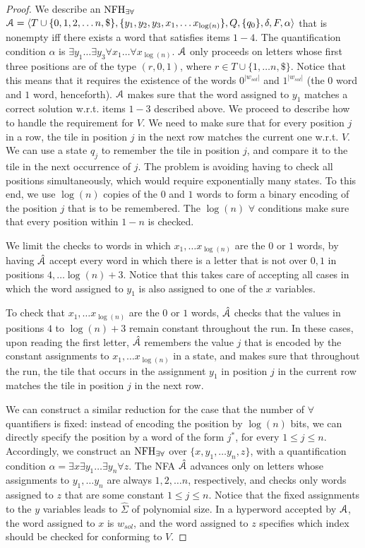 \begin{proof}
We describe an $\textrm{NFH}_{\exists\forall}$ $\mathcal{A} = \langle T\cup \{0,1,2,\ldots n,\$\}, \{y_1,y_2,y_3,x_1,\ldots x_{\log(n)}\}, Q, \{q_0\},\delta, F, \alpha \rangle$ that is nonempty iff there exists a word that satisfies items $1-4$.
The quantification condition $\alpha$ is $\exists y_1\ldots \exists y_3\forall x_1 \ldots \forall x_{\log(n)}$.
$\mathcal{A}$ only proceeds on letters whose first three positions are of the type $(r,0,1)$, where $r\in T\cup\{1,\ldots n,\$\}$. Notice that this means that it requires the existence of the words $0^{|w_{sol}|}$ and $1^{|w_{sol}|}$ (the $0$ word and $1$ word, henceforth).
$\mathcal{A}$ makes sure that the word assigned to $y_1$ matches a correct solution w.r.t. items $1-3$ described above.  
We proceed to describe how to handle the requirement for $V$. 
We need to make sure that for every position $j$ in a row, the tile in position $j$ in the next row matches the current one w.r.t. $V$. We can use a state $q_j$ to remember the tile in position $j$, and compare it to the tile in the next occurrence of $j$. The problem is avoiding having to check all positions simultaneously, which would require exponentially many states. To this end, we use $\log(n)$ copies of the $0$ and $1$ words to form a binary encoding of the position $j$ that is to be remembered. The $\log(n)$ $\forall$ conditions make sure that every position within $1-n$ is checked.  

We limit the checks to words in which $x_1,\ldots x_{\log(n)}$ are the $0$ or $1$ words, by having $\hat{\mathcal{A}}$ accept every word in which there is a letter that is not over $0,1$ in positions $4,\ldots \log(n)+3$. Notice that this takes care of accepting all cases in which the word assigned to $y_1$ is also assigned to one of the $x$ variables. 

To check that $x_1,\ldots x_{\log(n)}$ are the $0$ or $1$ words, $\hat{\mathcal{A}}$ checks that the values in positions $4$ to $\log(n)+3$ remain constant throughout the run. 
In these cases, upon reading the first letter, $\hat{\mathcal{A}}$ remembers the value $j$ that is encoded by the constant assignments to $x_1,\ldots x_{\log(n)}$ in a state, and makes sure that throughout the run, the tile that occurs in the assignment $y_1$ in position $j$ in the current row matches the tile in position $j$ in the next row. 

We can construct a similar reduction for the case that the number of $\forall$ quantifiers is fixed: instead of encoding the position by $\log(n)$ bits, we can directly specify the position by a word of the form $j^*$, for every $1\leq j\leq n$. 
Accordingly, we construct an $\textrm{NFH}_{\exists\forall}$ over $\{x, y_1,\ldots y_{n},z\}$, with a quantification condition $\alpha = \exists x\exists y_1 \ldots \exists y_{n}\forall z$. The NFA $\hat{\mathcal{A}}$ advances only on letters whose assignments to $y_1,\ldots y_n$ are always $1,2,\ldots n$, respectively, and checks only words assigned to $z$ that are some constant $1\leq j\leq n$. Notice that the fixed assignments to the $y$ variables leads to $\hat\Sigma$ of polynomial size.  
In a hyperword accepted by $\mathcal{A}$, the word assigned to $x$ is $w_{sol}$, and the word assigned to $z$ specifies which index should be checked for conforming to $V$.
\end{proof}

